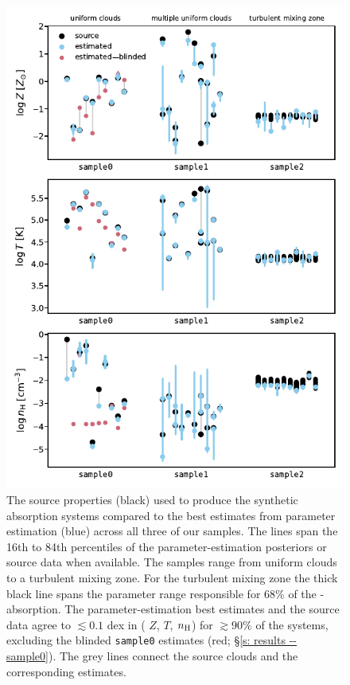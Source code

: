 \documentclass[fleqn,usenatbib]{mnras}
\begin{document}
\begin{figure}
    \centering
    \includegraphics[height=0.9\textheight]{figures/summary.pdf}
    \caption{
    The source properties (black) used to produce the synthetic absorption systems
    compared to the best estimates from parameter estimation (blue) across all three of our samples.
    The lines span the 16th to 84th percentiles of the parameter-estimation posteriors or source data when available.
    The samples range from uniform clouds to a turbulent mixing zone.
    For the turbulent mixing zone the thick black line spans the parameter range responsible for $68\%$ of the -absorption.
    The parameter-estimation best estimates and the source data agree to $\lesssim 0.1$ dex in ( $Z$, $T$, $n_{\rm H}$) for $\gtrsim 90\%$ of the systems,
    excluding the blinded \texttt{sample0} estimates (red; \S\ref{s: results -- sample0}).
    The grey lines connect the source clouds and the corresponding estimates.
    }
    \label{f: summary}
\end{figure}
\end{document}
